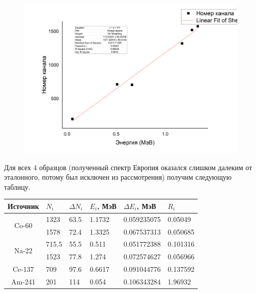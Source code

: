 \documentclass[%
 reprint,
 amsmath,amssymb,
 aps,
]{revtex4-2}
\begin{document}
\begin{figure}[]
	\includegraphics[scale=0.5]{4.png}
\end{figure}



Для всех 4 образцов (полученный спектр Европия оказался слишком далеким от эталонного, потому был исключен из рассмотрения) получим следующую таблицу.

\begin{table}[]
	\begin{tabular}{|c|l|l|l|l|l|}
		\hline
		\multicolumn{1}{|l|}{Источник} & $N_i$  & $\Delta N_i$ & $E_i$, МэВ & $\Delta E_i$, МэВ & $R_i$     \\ \hline
		\multirow{2}{*}{Co-60}         & 1323  & 63.5                       & 1.1732    & 0.059235075                     & 0.05049  \\ \cline{2-6} 
		& 1578  & 72.4                       & 1.3325    & 0.067537313                     & 0.050685 \\ \hline
		\multirow{2}{*}{Na-22}         & 715.5 & 55.5                       & 0.511     & 0.051772388                     & 0.101316 \\ \cline{2-6} 
		& 1523  & 77.8                       & 1.274     & 0.072574627                     & 0.056966 \\ \hline
		Ce-137                         & 709   & 97.6                       & 0.6617    & 0.091044776                     & 0.137592 \\ \hline
		Am-241                         & 201   & 114                        & 0.054     & 0.106343284                     & 1.96932  \\ \hline
	\end{tabular}
\end{table}
\end{document}
